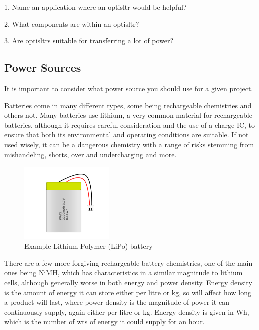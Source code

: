 \documentclass[a4paper,11pt]{report}
\newcommand{\Quiz}[1] %
{
\par\noindent %
\phantomsection %
\todo[inline, color=blue!30]{\textbf{#1}} %
\vspace{1em} %
}
\begin{document}
\Quiz{Quiz}

1. Name an application where an \gls{optisltr} would be helpful?

2. What components are within an \gls{optisltr}?

3. Are \gls{optisltr}s suitable for transferring a lot of power?

\vspace*{1\baselineskip}

\subsection{Power Sources}

It is important to consider what power source you should use for a given project.

Batteries come in many different types, some being rechargeable chemistries and others not. Many batteries use lithium, a very common material for rechargeable batteries, although it requires careful consideration and the use of a charge IC, to ensure that both its environmental and operating conditions are suitable. If not used wisely, it can be a dangerous chemistry with a range of risks stemming from mishandeling, shorts, over and undercharging and more.

\begin{figure}[H]
\centering
\includegraphics[width=0.4\textwidth]{lipobattery}
\caption{Example Lithium Polymer (LiPo) battery}
\end{figure}

There are a few more forgiving rechargeable battery chemistries, one of the main ones being NiMH, which has characteristics in a similar magnitude to lithium cells, although generally worse in both energy and power density. Energy density is the amount of energy it can store either per litre or kg, so will affect how long a product will last, where power density is the magnitude of power it can continuously supply, again either per litre or kg. Energy density is given in Wh, which is the number of \gls{wt}s of energy it could supply for an hour.
\end{document}
